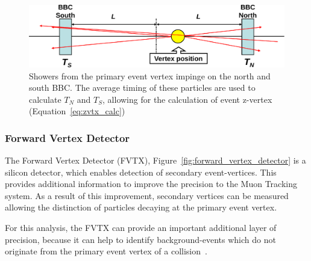\begin{figure}[ht]
  \centering
  \includegraphics[width=\linewidth]{./figures/bbc_vertex_reconstruction.pdf}
  \caption{
    Showers from the primary event vertex impinge on the north and south BBC.
    The average timing of these particles are used to calculate $T_N$ and $T_S$,
    allowing for the calculation of event z-vertex (Equation~\ref{eq:zvtx_calc})
  }
  \label{fig:bbc_vertex_reconstruction}
\end{figure}

\clearpage
\subsubsection{Forward Vertex Detector}

The Forward Vertex Detector (FVTX), Figure~\ref{fig:forward_vertex_detector} is
a silicon detector, which enables detection of secondary event-vertices.  This
provides additional information to improve the precision to the Muon Tracking
system. As a result of this improvement, secondary vertices can be measured
allowing the distinction of particles decaying at the primary event vertex. 

For this analysis, the FVTX can provide an important additional layer of
precision, because it can help to identify background-events which do not
originate from the primary event vertex of a collision~\cite{Aidala2014}.  

